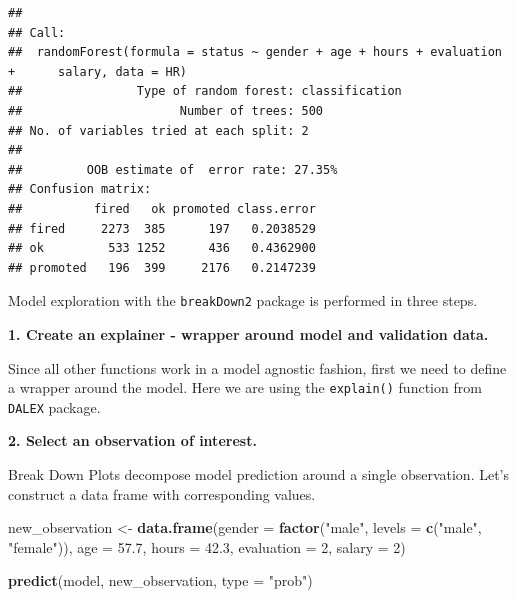 \documentclass[]{krantz}
\newenvironment{Shaded}{\begin{snugshade}}{\end{snugshade}}
\newcommand{\DataTypeTok}[1]{\textcolor[rgb]{0.13,0.29,0.53}{#1}}
\newcommand{\DecValTok}[1]{\textcolor[rgb]{0.00,0.00,0.81}{#1}}
\newcommand{\FloatTok}[1]{\textcolor[rgb]{0.00,0.00,0.81}{#1}}
\newcommand{\KeywordTok}[1]{\textcolor[rgb]{0.13,0.29,0.53}{\textbf{#1}}}
\newcommand{\NormalTok}[1]{#1}
\newcommand{\OperatorTok}[1]{\textcolor[rgb]{0.81,0.36,0.00}{\textbf{#1}}}
\newcommand{\StringTok}[1]{\textcolor[rgb]{0.31,0.60,0.02}{#1}}
\theoremstyle{definition}
\theoremstyle{definition}
\theoremstyle{definition}
\theoremstyle{remark}
\begin{document}
\begin{verbatim}
## 
## Call:
##  randomForest(formula = status ~ gender + age + hours + evaluation +      salary, data = HR) 
##                Type of random forest: classification
##                      Number of trees: 500
## No. of variables tried at each split: 2
## 
##         OOB estimate of  error rate: 27.35%
## Confusion matrix:
##          fired   ok promoted class.error
## fired     2273  385      197   0.2038529
## ok         533 1252      436   0.4362900
## promoted   196  399     2176   0.2147239
\end{verbatim}

Model exploration with the \texttt{breakDown2} package is performed in
three steps.

\textbf{1. Create an explainer - wrapper around model and validation
data.}

Since all other functions work in a model agnostic fashion, first we
need to define a wrapper around the model. Here we are using the
\texttt{explain()} function from \texttt{DALEX} package.

\begin{Shaded}
\end{Shaded}

\textbf{2. Select an observation of interest.}

Break Down Plots decompose model prediction around a single observation.
Let's construct a data frame with corresponding values.

\begin{Shaded}
\begin{Highlighting}[]
\NormalTok{new_observation <-}\StringTok{ }\KeywordTok{data.frame}\NormalTok{(}\DataTypeTok{gender =} \KeywordTok{factor}\NormalTok{(}\StringTok{"male"}\NormalTok{, }\DataTypeTok{levels =} \KeywordTok{c}\NormalTok{(}\StringTok{"male"}\NormalTok{, }\StringTok{"female"}\NormalTok{)),}
                      \DataTypeTok{age =} \FloatTok{57.7}\NormalTok{,}
                      \DataTypeTok{hours =} \FloatTok{42.3}\NormalTok{,}
                      \DataTypeTok{evaluation =} \DecValTok{2}\NormalTok{,}
                      \DataTypeTok{salary =} \DecValTok{2}\NormalTok{)}

\KeywordTok{predict}\NormalTok{(model, new_observation, }\DataTypeTok{type =} \StringTok{"prob"}\NormalTok{)}
\end{Highlighting}
\end{Shaded}
\end{document}
